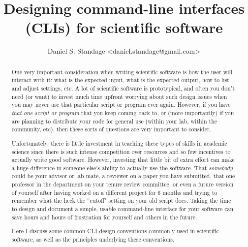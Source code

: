 \documentclass{article}
\begin{document}

\title{Designing command-line interfaces (CLIs) for scientific software}
\author{Daniel S. Standage \textless daniel.standage@gmail.com\textgreater}
\maketitle

\begin{abstract}
One very important consideration when writing scientific software is how the user will interact with it: what is the expected input, what is the expected output, how to list and adjust settings, etc. A lot of scientific software is prototypical, and often you don't need (or want) to invest much time upfront worrying about such design issues when you may never use that particular script or program ever again. However, if you have \textit{that one script or program} that you keep coming back to, or (more importantly) if you are planning to distribute your code for general use (within your lab, within the community, etc), then these sorts of questions are very important to consider.

Unfortunately, there is little investment in teaching these types of skills in academic science since there is such intense competition over resources and so few incentives to actually write good software. However, investing that little bit of extra effort can make a huge difference in someone else's ability to actually use the software. That \textit{somebody} could be your advisor or lab mate, a reviewer on a paper you have submitted, that one professor in the department on your tenure review committee, or even a future version of yourself after having worked on a different project for 6 months and trying to remember what the heck the ``cutoff" setting on your old script does. Taking the time to design and document a simple, usable command-line interface for your software can save hours and hours of frustration for yourself and others in the future.

Here I discuss some common CLI design conventions commonly used in scientific software, as well as the principles underlying these conventions.
\end{abstract}

\tableofcontents
\clearpage
\end{document}
